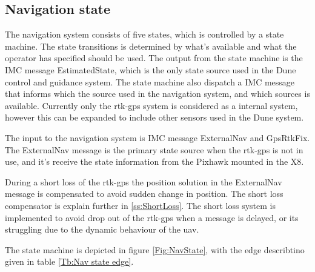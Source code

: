\subsection{Navigation state}
The navigation system consists of five states, which is controlled by a state machine. The state transitions is determined by what's available and what the operator has specified should be used. The output from the state machine is the IMC message EstimatedState, which is the only state source used in the Dune control and guidance system. The state machine also dispatch a IMC message that informs which the source used in the navigation system, and which sources is available. Currently only the \gls{rtk-gps} system is considered as a internal system, however this can be expanded to include other sensors used in the Dune system.

The input to the navigation system is IMC message ExternalNav and GpsRtkFix. The ExternalNav message is the primary state source when the \gls{rtk-gps} is not in use, and it's receive the state information from the Pixhawk mounted in the X8.

During a short loss of the \gls{rtk-gps} the position solution in the ExternalNav message is compensated to avoid sudden change in position. The short loss compensator is explain further in \ref{ss:ShortLoss}. The short loss system is implemented to avoid drop out of the \gls{rtk-gps} when a message is delayed, or its struggling due to the dynamic behaviour of the \gls{uav}.

The state machine is depicted in figure \ref{Fig:NavState}, with the edge describtino given in table \ref{Tb:Nav state edge}.

